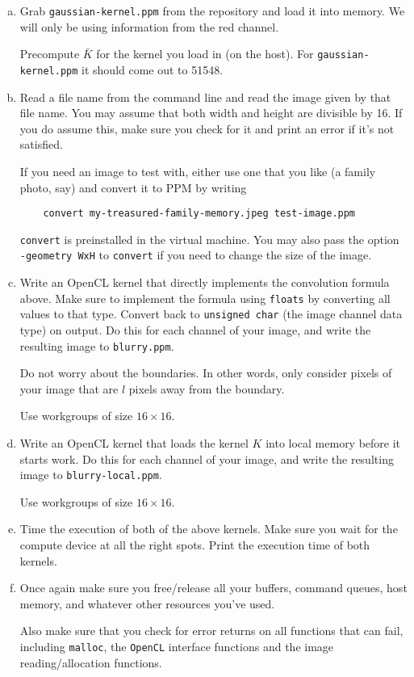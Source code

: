 \documentclass[11pt]{article}
\begin{document}
\begin{enumerate}[a)]
  \item Grab \texttt{gaussian-kernel.ppm} from the repository and load
    it into memory. We will only be using information from the red
    channel.

    Precompute $\bar K$ for the kernel you load in (on the host). For
    \texttt{gaussian-kernel.ppm} it should come out to 51548.

  \item Read a file name from the command line and read the image
    given by that file name. You may assume that both width and height
    are divisible by 16. If you do assume this, make sure you check
    for it and print an error if it's not satisfied.

    If you need an image to test with, either use one that you like (a
    family photo, say) and convert it to PPM by writing
    \begin{lstlisting}
    convert my-treasured-family-memory.jpeg test-image.ppm
    \end{lstlisting}
    \texttt{convert} is preinstalled in the virtual machine. You may
    also pass the option \texttt{-geometry WxH} to \texttt{convert}
    if you need to change the size of the image.
  \item Write an OpenCL kernel that directly implements the
    convolution formula above. Make sure to implement the formula
    using \texttt{floats} by converting all values to that type.
    Convert back to \texttt{unsigned char} (the image channel data
    type) on output. Do this for each channel of your image,
    and write the resulting image to \texttt{blurry.ppm}.

    Do not worry about the boundaries. In other words, only consider
    pixels of your image that are $l$ pixels away from the boundary.

    Use workgroups of size $16\times 16$.
  \item Write an OpenCL kernel that loads the kernel $K$ into local
    memory before it starts work.  Do this for each channel of your
    image, and write the resulting image to \texttt{blurry-local.ppm}.

    Use workgroups of size $16\times 16$.

  \item Time the execution of both of the above kernels. Make sure you
    wait for the compute device at all the right spots. Print the
    execution time of both kernels.
  \item Once again make sure you free/release all your buffers,
    command queues, host memory, and whatever other resources you've
    used.

    Also make sure that you check for error returns on all functions
    that can fail, including \texttt{malloc}, the \texttt{OpenCL}
    interface functions and the image reading/allocation functions.
\end{enumerate}
\end{document}
